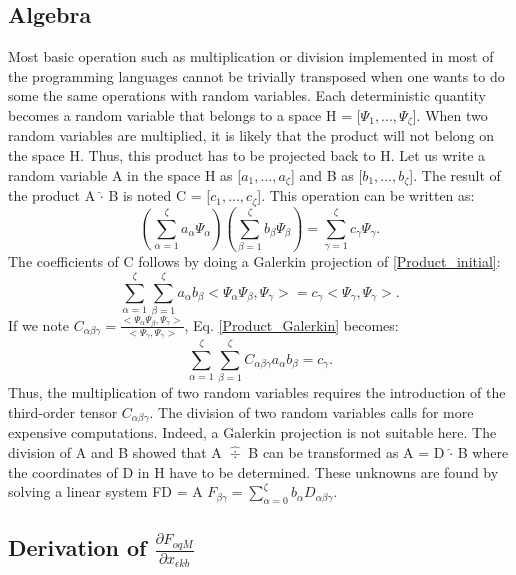 \documentclass[oneside,11pt,times]{book}
\newcommand\omicron{o}
\begin{document}
\subsection{Algebra}
Most basic operation such as multiplication or division implemented in most of the programming languages cannot be trivially transposed when one wants to do some the same operations with random variables. Each deterministic quantity becomes a random variable that belongs to a space H = [{$\Psi_1,...,\Psi_{\zeta}$}]. When two random variables are multiplied, it is likely that the product will not belong on the space H. Thus, this product has to be projected back to H. Let us write a random variable A in the space H as [$a_{1},...,a_{\zeta}$] and B as [$b_{1},...,b_{\zeta}$]. The result of the product A $\hat{\boldsymbol{\cdot}}$ B is noted C = [$c_{1},...,c_{\zeta}$]. This operation can be written as:
\begin{equation}
\label{Product_initial}
 \left(\sum_{\alpha=1}^{\zeta}a_{\alpha}\Psi_{\alpha}\right)\left(\sum_{\beta=1}^{\zeta}b_{\beta}\Psi_{\beta}\right) = \sum\limits_{\gamma=1}^{\zeta} c_{\gamma}\Psi_{\gamma}.
\end{equation}
The coefficients of C follows by doing a Galerkin projection of \eqref{Product_initial}:
\begin{equation}
\label{Product_Galerkin}
 \sum_{\alpha=1}^{\zeta}\sum_{\beta=1}^{\zeta}a_{\alpha}b_{\beta}<\Psi_{\alpha}\Psi_{\beta},\Psi_{\gamma}> = c_{\gamma} <\Psi_{\gamma},\Psi_{\gamma}>.
\end{equation} If we note $C_{\alpha \beta \gamma} = \frac{<\Psi_{\alpha}\Psi_{\beta},\Psi_{\gamma}>}{<\Psi_{\gamma},\Psi_{\gamma}>}$, Eq. \ref{Product_Galerkin} becomes:
\begin{equation}
\label{Product_Galerkin_final}
 \sum_{\alpha=1}^{\zeta}\sum_{\beta=1}^{\zeta}C_{\alpha \beta \gamma}a_{\alpha}b_{\beta} = c_{\gamma} .
\end{equation}
Thus, the multiplication of two random variables requires the introduction of the third-order tensor $C_{\alpha \beta \gamma}$. The division of two random variables calls for more expensive computations. Indeed, a Galerkin projection is not suitable here. The division of A and B showed that A $\hat{\div}$ B can be transformed as A = D $\hat{\boldsymbol{\cdot}}$ B where the coordinates of D in H have to be determined. These unknowns are found by solving a linear system FD = A $F_{\beta \gamma} = \sum_{\alpha=0}^{\zeta}b_{\alpha}D_{\alpha \beta \gamma}$.
\subsection{Derivation of $\frac{\partial F_{ \omicron q M}}{\partial x_{ \epsilon k b}}$ }
\end{document}
